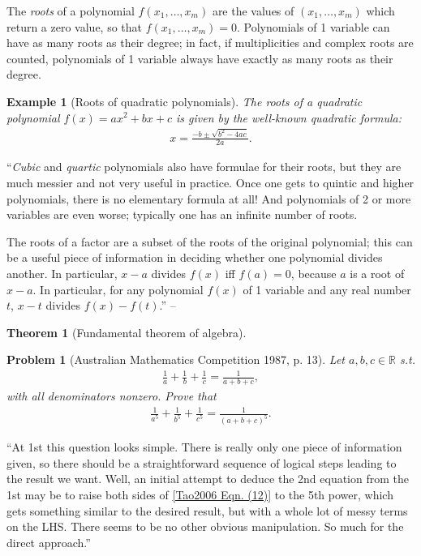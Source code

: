 \documentclass[oneside]{book}
\numberwithin{equation}{section}
\newtheorem{example}{Example}[section]
\newtheorem{problem}{Problem}[section]
\newtheorem{theorem}{Theorem}[section]
\begin{document}
The \emph{roots} of a polynomial $f(x_1,\ldots,x_m)$ are the values of $(x_1,\ldots,x_m)$ which return a zero value, so that $f(x_1,\ldots,x_m) = 0$. Polynomials of 1 variable can have as many roots as their degree; in fact, if multiplicities and complex roots are counted, polynomials of 1 variable always have exactly as many roots as their degree.

\begin{example}[Roots of quadratic polynomials]
	The roots of a quadratic polynomial $f(x) = ax^2 + bx + c$ is given by the well-known \emph{quadratic formula}:
	\begin{align*}
		x = \frac{-b\pm\sqrt{b^2 - 4ac}}{2a}.
	\end{align*}
\end{example}
``\textit{Cubic} and \textit{quartic} polynomials also have formulae for their roots, but they are much messier and not very useful in practice. Once one gets to quintic and higher polynomials, there is no elementary formula at all! And polynomials of 2 or more variables are even worse; typically one has an infinite number of roots.

The roots of a factor are a subset of the roots of the original polynomial; this can be a useful piece of information in deciding whether one polynomial divides another. In particular, $x - a$ divides $f(x)$ iff $f(a) = 0$, because $a$ is a root of $x - a$. In particular, for any polynomial $f(x)$ of 1 variable and any real number $t$, $x - t$ divides $f(x) - f(t)$.'' -- \cite[p. 42]{Tao2006}

\begin{theorem}[Fundamental theorem of algebra]
	
\end{theorem}

\begin{problem}[Australian Mathematics Competition 1987, p. 13]
	Let $a,b,c\in\mathbb{R}$ s.t.
	\begin{align}
		\label{Tao2006 Eqn. (12)}
		\frac{1}{a} + \frac{1}{b} + \frac{1}{c} = \frac{1}{a + b + c},
	\end{align}
	with all denominators nonzero. Prove that
	\begin{align*}
		\frac{1}{a^5} + \frac{1}{b^5} + \frac{1}{c^5} = \frac{1}{(a + b + c)^5}.
	\end{align*}
\end{problem}
``At 1st this question looks simple. There is really only one piece of information given, so there should be a straightforward sequence of logical steps leading to the result we want. Well, an initial attempt to deduce the 2nd equation from the 1st may be to raise both sides of \eqref{Tao2006 Eqn. (12)} to the 5th power, which gets something similar to the desired result, but with a whole lot of messy terms on the LHS. There seems to be no other obvious manipulation. So much for the direct approach.''
\end{document}
